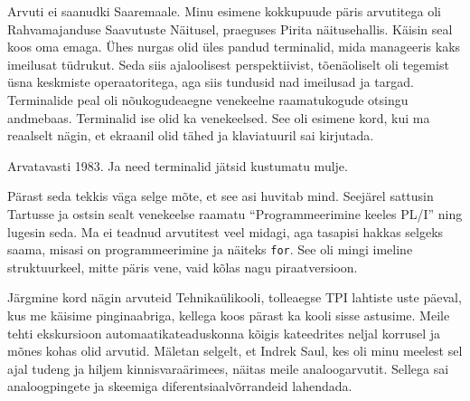 \label{cptr:mast}


Arvuti ei saanudki Saaremaale. Minu esimene kokkupuude päris arvutitega oli 
Rahvamajanduse Saavutuste Näitusel, praeguses Pirita näitusehallis. Käisin 
seal koos oma emaga. Ühes nurgas olid üles pandud 
terminalid, mida manageeris kaks imeilusat tüdrukut. Seda siis ajaloolisest perspektiivist, tõenäoliselt oli tegemist üsna keskmiste 
operaatoritega, aga siis tundusid nad imeilusad ja targad. Terminalide peal oli 
nõukogudeaegne venekeelne raamatukogude otsingu andmebaas. Terminalid ise olid ka 
venekeelsed. See oli esimene kord, kui ma reaalselt nägin, et ekraanil olid 
tähed ja klaviatuuril sai kirjutada. 


Arvatavasti 1983. Ja need terminalid jätsid kustumatu mulje. 


Pärast seda tekkis väga selge mõte, et see asi huvitab mind. 
Seejärel sattusin Tartusse ja ostsin sealt venekeelse 
raamatu \enquote{Programmeerimine keeles PL/I} ning lugesin 
seda. Ma ei teadnud arvutitest veel midagi, aga tasapisi hakkas selgeks saama, 
misasi on programmeerimine ja näiteks \verb|for|. See oli mingi imeline struktuurkeel, mitte päris vene, 
vaid kõlas nagu piraatversioon.

Järgmine kord nägin arvuteid Tehnikaülikooli, tolleaegse TPI lahtiste uste päeval, kus me käisime 
pinginaabriga, kellega koos pärast ka kooli sisse astusime. 
Meile tehti ekskursioon automaatikateaduskonna kõigis 
kateedrites neljal 
korrusel ja mõnes kohas olid arvutid. Mäletan selgelt, et Indrek 
Saul, kes oli minu meelest sel ajal tudeng ja hiljem 
kinnisvaraärimees, näitas meile analoogarvutit. Sellega
sai analoogpingete ja skeemiga diferentsiaalvõrrandeid lahendada.


